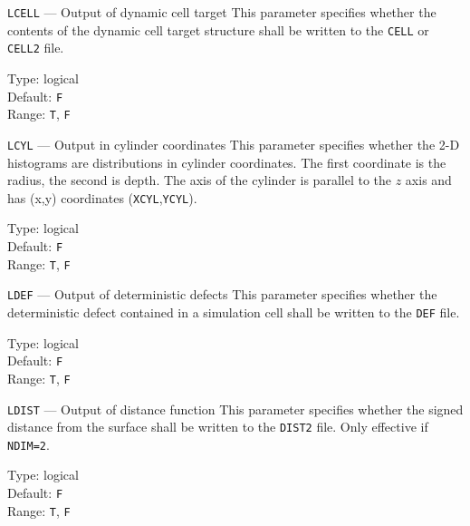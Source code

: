 \begin{keydescription}{\texttt{LCELL} --- Output of dynamic cell target}
%
  This parameter specifies whether the contents of the dynamic cell target structure shall be 
  written to the \texttt{CELL} or \texttt{CELL2} file.
 \begin{keytab}
    Type:    \> logical \\
    Default: \> \texttt{F} \\
    Range:   \> \texttt{T}, \texttt{F} 
  \end{keytab}
\end{keydescription}

\begin{keydescription}{\texttt{LCYL} --- Output in cylinder coordinates}
%
  This parameter specifies whether the 2-D histograms are distributions in cylinder 
  coordinates. The first coordinate is the radius, the second is depth. The axis of the 
  cylinder is parallel to the $z$ axis and has (x,y) coordinates
  (\texttt{XCYL},\texttt{YCYL}).
  \begin{keytab}
    Type:    \> logical \\
    Default: \> \texttt{F} \\
    Range:   \> \texttt{T}, \texttt{F} 
  \end{keytab}
\end{keydescription}

\ifprivate
\begin{keydescription}{\texttt{LDEF} --- Output of deterministic defects}
%
  This parameter specifies whether the deterministic defect contained in a simulation cell 
  shall be written to the \texttt{DEF} file.
  \begin{keytab}
    Type:    \> logical \\
    Default: \> \texttt{F} \\
    Range:   \> \texttt{T}, \texttt{F} 
  \end{keytab}
\end{keydescription}
\fi

\begin{keydescription}{\texttt{LDIST} --- Output of distance function}
%
  This parameter specifies whether the signed distance from the surface shall be written to the 
  \texttt{DIST2} file. Only effective if \texttt{NDIM=2}.
  \begin{keytab}
    Type:    \> logical \\
    Default: \> \texttt{F} \\
    Range:   \> \texttt{T}, \texttt{F} 
  \end{keytab}
\end{keydescription}


